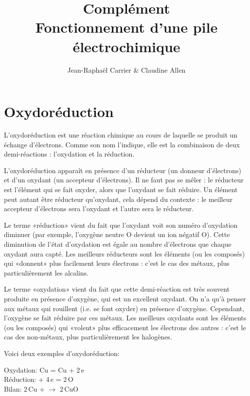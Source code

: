 \documentclass[12pt,oneside,letterpaper]{article}
\begin{document}
\title{\textbf{Complément}\\Fonctionnement d'une pile électrochimique}
\author{Jean-Raphaël Carrier \& Claudine Allen}
\date{}
\maketitle


\section{Oxydoréduction}

L'oxydoréduction est une réaction chimique au cours de laquelle se produit un échange d'électrons. Comme son nom l'indique, elle est la combinaison de deux demi-réactions : l'oxydation et la réduction.

L'oxydoréduction apparaît en présence d'un réducteur (un donneur d'électrons) et d'un oxydant (un accepteur d'électrons). Il ne faut pas se mêler : le réducteur est l'élément qui se fait oxyder, alors que l'oxydant se fait réduire. Un élément peut autant être réducteur qu'oxydant, cela dépend du contexte : le meilleur accepteur d'électrons sera l'oxydant et l'autre sera le réducteur.

Le terme «réduction» vient du fait que l'oxydant voit son numéro d'oxydation diminuer (par exemple, l'oxygène neutre O devient un ion négatif O). Cette diminution de l'état d'oxydation est égale au nombre d'électrons que chaque oxydant aura capté. Les meilleurs réducteurs sont les éléments (ou les composés) qui «donnent» plus facilement leurs électrons : c'est le cas des métaux, plus particulièrement les alcalins.

Le terme «oxydation» vient du fait que cette demi-réaction est très souvent produite en présence d'oxygène, qui est un excellent oxydant. On n'a qu'à penser aux métaux qui rouillent (i.e. se font oxyder) en présence d'oxygène. Cependant, l'oxygène se fait réduire par ces métaux. Les meilleurs oxydants sont les éléments (ou les composés) qui «volent» plus efficacement les électrons des autres : c'est le cas des non-métaux, plus particulièrement les halogènes.

Voici deux exemples d'oxydoréduction:
\begin{center}
Oxydation: Cu = Cu + 2\,e\up{--}\\
Réduction:  + 4\,e\up{--} = 2\,O\\
Bilan: 2\,Cu +  $\rightarrow$ 2\,CuO
\end{center}
\end{document}
